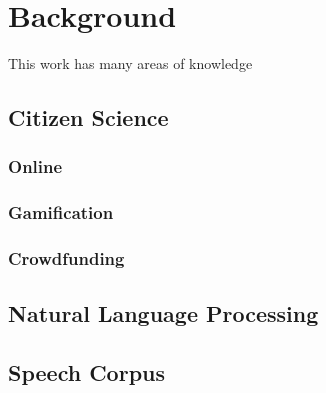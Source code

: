 \chapter{Background}

This work has many areas of knowledge

\section{Citizen Science}

\subsection{Online}
\subsection{Gamification}
\subsection{Crowdfunding}

\section{Natural Language Processing}

\subsection{}

\section{Speech Corpus}
